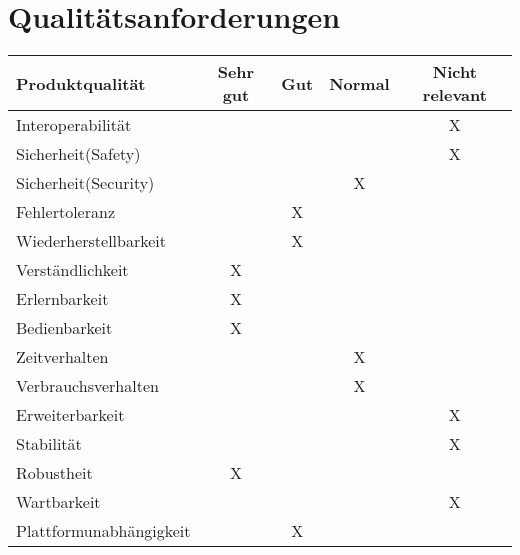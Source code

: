 \chapter{Qualitätsanforderungen}

	\begin{tabular}{ l c c c c }
		\textbf{Produktqualität} & \textbf{Sehr gut} & \textbf{Gut} & \textbf{Normal} & \textbf{Nicht relevant} \\ \hline \hline
		Interoperabilität &  & & & X \\ \hline
		Sicherheit(Safety) & & & & X \\ \hline
		Sicherheit(Security) & &  & X & \\ \hline
		Fehlertoleranz & & X & & \\ \hline
		Wiederherstellbarkeit & & X & & \\ \hline
		Verständlichkeit & X & & & \\ \hline
		Erlernbarkeit & X &  & & \\ \hline
		Bedienbarkeit & X & & & \\ \hline
		Zeitverhalten & & & X & \\ \hline
		Verbrauchsverhalten & & & X & \\ \hline
		Erweiterbarkeit & & & & X \\ \hline
		Stabilität & & & & X \\ \hline
		Robustheit & X & & & \\ \hline
		Wartbarkeit & & & & X\\ \hline
		Plattformunabhängigkeit & & X & & \\ \hline
	\end{tabular}